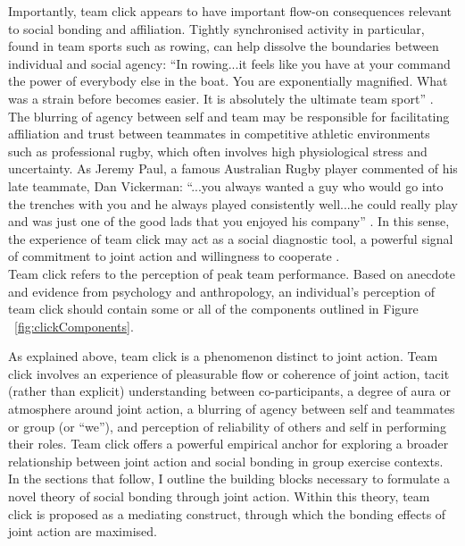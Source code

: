 \begin{CJK}{UTF8}{gbsn}
Importantly, team click appears to have important flow-on consequences relevant to social bonding and affiliation. Tightly synchronised activity in particular, found in team sports such as rowing, can help dissolve the boundaries between individual and social agency: ``In rowing...it feels like you have at your command the power of everybody else in the boat. You are exponentially magnified. What was a strain before becomes easier. It is absolutely the ultimate team sport'' \citep[x]{Brown2016}.
The blurring of agency between self and team may be responsible for facilitating affiliation and trust between teammates in competitive athletic environments such as professional rugby, which often involves high physiological stress and uncertainty.  As Jeremy Paul, a famous Australian Rugby player commented of his late teammate, Dan Vickerman: ``...you always wanted a guy who would go into the trenches with you and he always played consistently well...he could really play and was just one of the good lads that you enjoyed his company'' \citep{Fox-Sports2017}.  In this sense, the experience of team click may act as a social diagnostic tool, a powerful signal of commitment to joint action and willingness to cooperate \citep{Reddish2013a}. \\

Team click refers to the perception of peak team performance.  Based on anecdote and evidence from psychology and anthropology, an individual's perception of team click should contain some or all of the components outlined in Figure ~\ref{fig:clickComponents}.



As explained above, team click is a phenomenon distinct to joint action.  Team click involves an experience of pleasurable flow or coherence of joint action, tacit (rather than explicit) understanding between co-participants, a degree of aura or atmosphere around joint action, a blurring of agency between self and teammates or group (or ``we''), and perception of reliability of others and self in performing their roles.  Team click offers a powerful empirical anchor for exploring a broader relationship between joint action and social bonding in group exercise contexts.  In the sections that follow, I outline the building blocks necessary to formulate a novel theory of social bonding through joint action.  Within this theory, team click is proposed as a mediating construct, through which the bonding effects of joint action are maximised.


\end{CJK}
